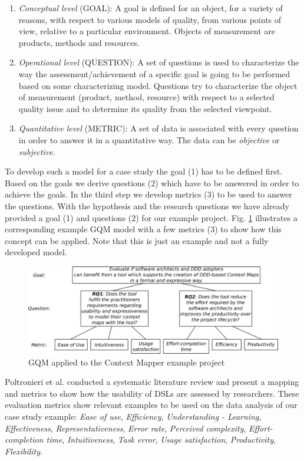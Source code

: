 \documentclass[runningheads]{llncs}
\begin{document}
\begin{enumerate}
	\item \textit{Conceptual level} (GOAL): A goal is defined for an object, for a variety of reasons, with respect to various models of quality, from various points of view, relative to a particular environment. Objects of measurement are products, methods and resources.
	\item \textit{Operational level} (QUESTION): A set of questions is used to characterize the way the assessment/achievement of a specific goal is going to be performed based on some characterizing model. Questions try to characterize the object of measurement (product, method, resource) with respect to a selected quality issue and to determine its quality from the selected viewpoint.
	\item \textit{Quantitative level} (METRIC): A set of data is associated with every question in order to answer it in a quantitative way. The data can be \textit{objective} or \textit{subjective}.
\end{enumerate}

To develop such a model for a case study the goal (1) has to be defined first. Based on the goals we derive questions (2) which have to be answered in order to achieve the goals. In the third step we develop metrics (3) to be used to answer the questions. With the hypothesis and the research questions we have already provided a goal (1) and questions (2) for our example project. Fig. \ref{fig:gqm-example} illustrates a corresponding example GQM model with a few metrics (3) \cite{10.1007/978-3-319-58071-5_39} to show how this concept can be applied. Note that this is just an example and not a fully developed model.

\begin{figure}[H]
	\centering
	\includegraphics[width=1.0\textwidth]{gqm-example}
	\caption{GQM applied to the Context Mapper example project}
	\label{fig:gqm-example}
\end{figure} 

Poltronieri et al. \cite{10.1007/978-3-319-58071-5_39} conducted a systematic literature review and present a mapping and metrics to show how the usability of DSLs are assessed by researchers. These evaluation metrics show relevant examples to be used on the data analysis of our case study example: \textit{Ease of use}, \textit{Efficiency}, \textit{Understanding - Learning}, \textit{Effectiveness}, \textit{Representativeness}, \textit{Error rate}, \textit{Perceived complexity}, \textit{Effort-completion time}, \textit{Intuitiveness}, \textit{Task error}, \textit{Usage satisfaction}, \textit{Productivity}, \textit{Flexibility}.
\end{document}
